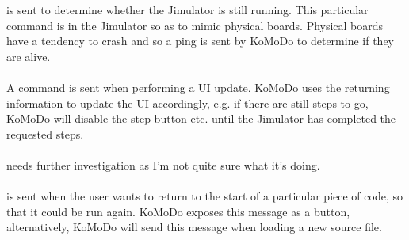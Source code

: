 %
%
%
 is sent to determine whether the Jimulator is still running. This particular command is in the Jimulator so as to mimic physical boards. Physical boards have a tendency to crash and so a ping is sent by KoMoDo to determine if they are alive.\\\\
%
A  command is sent when performing a UI update. KoMoDo uses the returning information to update the UI accordingly, e.g. if there are still steps to go, KoMoDo will disable the step button etc. until the Jimulator has completed the requested steps.\\\\
%
 needs further investigation as I'm not quite sure what it's doing.\\\\
%
%
%
%
 is sent when the user wants to return to the start of a particular piece of code, so that it could be run again. KoMoDo exposes this message as a button, alternatively, KoMoDo will send this message when loading a new source file.\\\\
